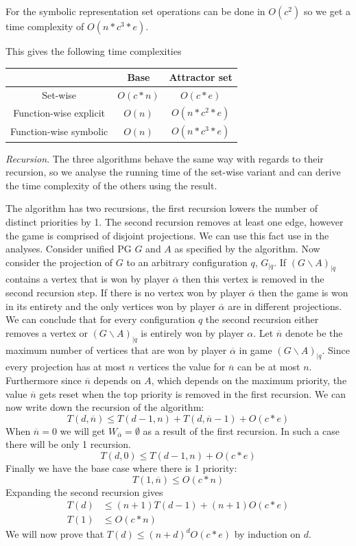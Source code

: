 For the symbolic representation set operations can be done in $O(c^2)$ so we get a time complexity of $O(n*c^3*e)$.

This gives the following time complexities\\
\begin{center}
	\begin{tabular}{|c|c|c|}
		\hline 
		& Base & Attractor set \\ 
		\hline 
		Set-wise & $O(c*n)$ & $O(c*e)$  \\ 
		\hline 
		Function-wise explicit & $O(n)$ &  $O(n*c^2*e)$ \\ 
		\hline 
		Function-wise symbolic & $O(n)$ &  $O(n* c^3*e)$ \\ 
		\hline 
	\end{tabular} 
\end{center}

\textit{Recursion}. The three algorithms behave the same way with regards to their recursion, so we analyse the running time of the set-wise variant and can derive the time complexity of the others using the result.

The algorithm has two recursions, the first recursion lowers the number of distinct priorities by 1. The second recursion removes at least one edge, however the game is comprised of disjoint projections. We can use this fact use in the analyses. Consider unified PG $G$ and $A$ as specified by the algorithm. Now consider the projection of $G$ to an arbitrary configuration $q$, $G_{|q}$. If $(G\backslash A)_{|q}$ contains a vertex that is won by player $\overline{\alpha}$ then this vertex is removed in the second recursion step. If there is no vertex won by player $\overline{\alpha}$ then the game is won in its entirety and the only vertices won by player $\overline{\alpha}$ are in different projections. We can conclude that for every configuration $q$ the second recursion either removes a vertex or $(G\backslash A)_{|q}$ is entirely won by player $\alpha$. Let $\overline{n}$ denote be the maximum number of vertices that are won by player $\overline{\alpha}$ in game $(G\backslash A)_{|q}$. Since every projection has at most $n$ vertices the value for $\overline{n}$ can be at most $n$. Furthermore since $\overline{n}$ depends on $A$, which depends on the maximum priority, the value $\overline{n}$ gets reset when the top priority is removed in the first recursion. We can now write down the recursion of the algorithm:
\[ T(d,\overline{n}) \leq T(d-1,n) + T(d, \overline{n} - 1) + O(c*e) \]
When $\overline{n} = 0$ we will get $W_{\overline{\alpha}} = \emptyset$ as a result of the first recursion. In such a case there will be only 1 recursion.
\[ T(d,0) \leq T(d-1,n) + O(c*e) \]
Finally we have the base case where there is 1 priority:
\[ T(1, \overline{n}) \leq O(c*n) \]
Expanding the second recursion gives
\begin{align*}
T(d) &\leq (n+1)T(d-1) + (n+1)O(c*e)\\
T(1) &\leq O(c*n)
\end{align*}
We will now prove that $T(d) \leq (n+d)^dO(c*e)$ by induction on $d$.


